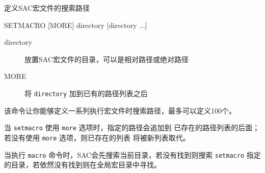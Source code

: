 \label{cmd:setmacro}

定义SAC宏文件的搜索路径

\begin{SACSTX}
SETMACRO [MORE] directory [directory ...]
\end{SACSTX}

\begin{description}
\item [directory] 放置SAC宏文件的目录，可以是相对路径或绝对路径
\item [MORE] 将 \texttt{directory} 加到已有的路径列表之后
\end{description}

该命令让你能够定义一系列执行宏文件时搜索路径，最多可以定义100个。

当 \texttt{setmacro} 使用 \texttt{more} 选项时，指定的路径会追加到
已存在的路径列表的后面；若没有使用 \texttt{more} 选项，则已存在的列表
将被新列表取代。

当执行 \texttt{macro} 命令时，SAC会先搜索当前目录，若没有找到则搜索
\texttt{setmacro} 指定的目录，若依然没有找到则在全局宏目录中寻找。
